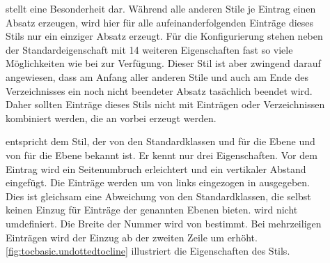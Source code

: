 \begin{description}
\item[]%
  stellt eine Besonderheit dar. Während alle anderen Stile je Eintrag einen
  Absatz
  erzeugen, wird hier für alle aufeinanderfolgenden Einträge dieses Stils nur
  ein einziger Absatz erzeugt.  Für die Konfigurierung stehen neben der
  Standardeigenschaft  mit 14 weiteren Eigenschaften fast so
  viele Möglichkeiten wie bei  zur Verfügung. Dieser Stil ist
  aber zwingend darauf angewiesen, dass am Anfang aller anderen Stile und auch
  am Ende des Verzeichnisses ein noch nicht beendeter Absatz tasächlich
  beendet wird. Daher sollten Einträge dieses Stils nicht mit Einträgen oder
  Verzeichnissen kombiniert werden, die an  vorbei erzeugt
  werden.
\item[] entspricht dem Stil, der von den
  Standardklassen  und  für die Ebene
   und von  für die Ebene 
  bekannt ist. Er kennt nur drei Eigenschaften.
  Vor dem Eintrag wird ein Seitenumbruch erleichtert und ein vertikaler
  Abstand eingefügt. Die Einträge werden um  von links
  eingezogen in  ausgegeben. Dies ist gleichsam eine
  Abweichung von den Standardklassen, die selbst keinen Einzug für Einträge
  der genannten Ebenen bieten.  wird nicht
  umdefiniert. Die Breite der Nummer wird von  bestimmt. Bei
  mehrzeiligen Einträgen wird der Einzug ab der zweiten Zeile um
   erhöht. \autoref{fig:tocbasic.undottedtocline} illustriert
  die Eigenschaften des Stils.
  \begin{figure}
    \centering
\end{figure}
\end{description}
